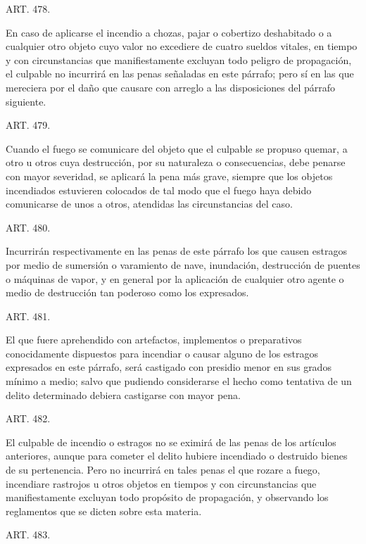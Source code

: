     ART. 478.

    En caso de aplicarse el incendio a chozas, pajar o cobertizo deshabitado o a cualquier otro objeto cuyo valor no excediere de cuatro sueldos vitales, en tiempo y con circunstancias que manifiestamente excluyan todo peligro de propagación, el culpable no incurrirá en las penas señaladas en este párrafo; pero sí en las que mereciera por el daño que causare con arreglo a las disposiciones del párrafo siguiente.


    ART. 479.

    Cuando el fuego se comunicare del objeto que el culpable se propuso quemar, a otro u otros cuya destrucción, por su naturaleza o consecuencias, debe penarse con mayor severidad, se aplicará la pena más grave, siempre que los objetos incendiados estuvieren colocados de tal modo que el fuego haya debido comunicarse de unos a otros, atendidas las circunstancias del caso.


    ART. 480.

    Incurrirán respectivamente en las penas de este párrafo los que causen estragos por medio de sumersión o varamiento de nave, inundación, destrucción de puentes o máquinas de vapor, y en general por la aplicación de cualquier otro agente o medio de destrucción tan poderoso como los expresados.



    ART. 481.

    El que fuere aprehendido con artefactos, implementos o preparativos conocidamente dispuestos para incendiar o causar alguno de los estragos expresados en este párrafo, será castigado con presidio menor en sus grados mínimo a medio; salvo que pudiendo considerarse el hecho como tentativa de un delito determinado debiera castigarse con mayor pena.



    ART. 482.

    El culpable de incendio o estragos no se eximirá de las penas de los artículos anteriores, aunque para cometer el delito hubiere incendiado o destruido bienes de su pertenencia.
    Pero no incurrirá en tales penas el que rozare a fuego, incendiare rastrojos u otros objetos en tiempos y con circunstancias que manifiestamente excluyan todo propósito de propagación, y observando los reglamentos que se dicten sobre esta materia.



    ART. 483.

